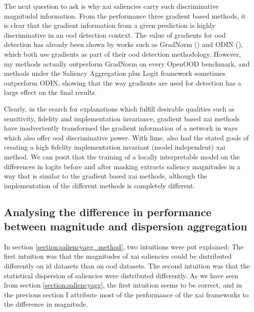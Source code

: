 \documentclass[UKenglish]{uiomasterthesis} %
\theoremstyle{definition}
\begin{document}
The next question to ask is why \ac{xai} saliencies carry such discriminative magnitudal information. From the performance three gradient based methods, it is clear that the gradient information from a given prediction is highly discriminative in an \ac{ood} detection context. The value of gradients for \ac{ood} detection has already been shown by works such as GradNorm (\cite{gradnorm}) and ODIN (\cite{odin}), which both use gradients as part of their \ac{ood} detection methodology. However, my methods actually outperform GradNorm on every OpenOOD benchmark, and methods under the Saliency Aggregation plus Logit framework sometimes outperform ODIN, showing that the way gradients are used for detection has a large effect on the final results.

Clearly, in the search for explanations which fulfill desirable qualities such as sensitivity, fidelity and implementation invariance, gradient based \ac{xai} methods have inadvertently transformed the gradient information of a network in ways which also offer \ac{ood} discriminative power. With \ac{lime}, \cite{lime} also had the stated goals of creating a high fidelity implementation invariant (model independent) \ac{xai} method. We can posit that the training of a locally interpretable model on the differences in logits before and after masking extracts saliency magnitudes in a way that is similar to the gradient based \ac{xai} methods, although the implementation of the different methods is completely different.

\subsection{Analysing the difference in performance between magnitude and dispersion aggregation}

In section \ref{section:saliencyagg_method}, two intuitions were put explained: The first intuition was that the magnitudes of \ac{xai} saliencies could be distributed differently on \ac{id} datasets than on \ac{ood} datasets. The second intuition was that the statistical dispersion of saliencies were distributed differently. As we have seen from section \ref{section:saliencyagg}, the first intuition seems to be correct, and in the previous section I attribute most of the performance of the \ac{xai} frameworks to the difference in magnitude.
\end{document}
